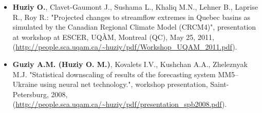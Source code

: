 {\begin{itemize}
    \item \textbf{Huziy O.}, Clavet-Gaumont J., Sushama L., Khaliq M.N., Lehner
    B., Laprise R., Roy R.: "Projected changes to streamflow extremes in Quebec
    basins as simulated by the Canadian Regional Climate Model (CRCM4)",
    presentation at workshop at ESCER, UQÀM, Montreal (QC), May 25, 2011,
    (\url{http://people.sca.uqam.ca/~huziy/pdf/Workshop_UQAM_2011.pdf}).

    \item \textbf{Guziy A.M. (Huziy O. M.)}, Kovalets I.V., Kushchan A.A.,
    Zheleznyak M.J.
    "Statistical downscaling of results of the forecasting system MM5–Ukraine using neural net technology.",
    workshop presentation, Saint-Petersburg, 2008, (\url{http://people.sca.uqam.ca/~huziy/pdf/presentation_spb2008.pdf}).

\end{itemize}
}
